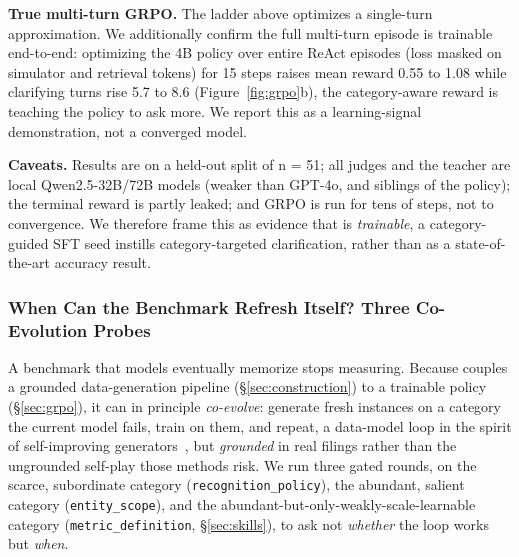 \textbf{True multi-turn GRPO.} The ladder above optimizes a single-turn
approximation. We additionally confirm the full multi-turn episode is trainable
end-to-end: optimizing the 4B policy over entire ReAct episodes (loss masked on
simulator and retrieval tokens) for 15 steps raises mean reward 0.55 to 1.08
while clarifying turns rise 5.7 to 8.6 (Figure~\ref{fig:grpo}b), the category-aware
reward is teaching the policy to ask more. We report this as a learning-signal
demonstration, not a converged model.

\textbf{Caveats.} Results are on a held-out split of n = 51; all judges and the
teacher are local Qwen2.5-32B/72B models (weaker than GPT-4o, and siblings of the
policy); the terminal reward is partly leaked; and GRPO is run for tens of steps,
not to convergence. We therefore frame this as evidence that \fininteract is
\emph{trainable}, a category-guided SFT seed instills category-targeted
clarification, rather than as a state-of-the-art accuracy result.



\subsubsection{When Can the Benchmark Refresh Itself? Three Co-Evolution Probes}
\label{sec:coevolve}

A benchmark that models eventually memorize stops measuring. Because \fininteract
couples a grounded data-generation pipeline (\S\ref{sec:construction}) to a
trainable policy (\S\ref{sec:grpo}), it can in principle \emph{co-evolve}: generate
fresh instances on a category the current model fails, train on them, and repeat, a
data-model loop in the spirit of self-improving
generators~\citep{mae2025}, but \emph{grounded} in real filings rather than the
ungrounded self-play those methods risk. We run three gated rounds, on the scarce,
subordinate category (\texttt{recognition\_policy}), the abundant, salient category
(\texttt{entity\_scope}), and the abundant-but-only-weakly-scale-learnable category
(\texttt{metric\_definition}, \S\ref{sec:skills}), to ask not \emph{whether} the
loop works but \emph{when}.


